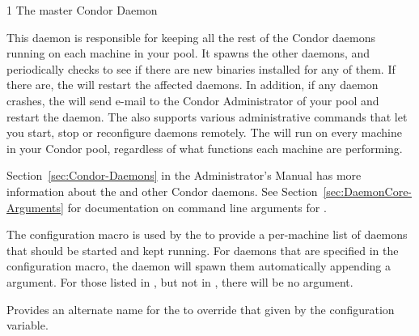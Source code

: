 \begin{ManPage}{\label{man-condor-master}}{1}
{The master Condor Daemon}

\Synopsis {}


\Description 

This daemon is responsible for keeping all the
rest of the Condor daemons running on each machine in your pool.  It  
spawns the other daemons, and periodically checks to see if there are
new binaries installed for any of them.  If there are,
the  will restart the affected daemons.
In addition, if any daemon crashes, the
 will send e-mail to the Condor Administrator of your pool and 
restart the daemon.  The  also supports various
administrative commands that let you start, stop or reconfigure
daemons remotely.  The  will run on every machine in 
your Condor pool, regardless of what functions each machine are
performing.

Section~\ref{sec:Condor-Daemons} in the Administrator's Manual
has more information
about the  and other Condor daemons.
See Section~\ref{sec:DaemonCore-Arguments}
for documentation on
command line arguments for .

The  configuration macro is used by the
 to provide a per-machine list of daemons that
should be started and kept running.
For daemons that are specified in the 
configuration macro,
the  daemon will spawn them automatically
appending a  argument.
For those listed in , but not in ,
there will be no  argument.

\begin{Options}
            {Provides an alternate name for the 
            to override that given by the 
	    configuration variable.
            }
\end{Options}

\end{ManPage}
